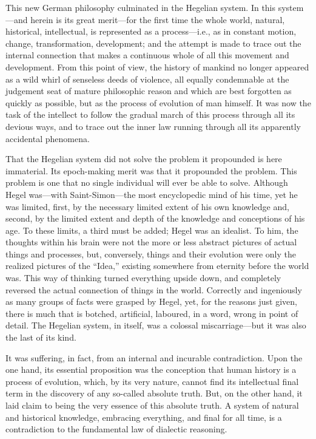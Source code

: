 This new German philosophy culminated in the Hegelian system. In this
system---and herein is its great merit---for the first time the whole world,
natural, historical, intellectual, is represented as a process---i.e., as in
constant motion, change, transformation, development; and the attempt is made to
trace out the internal connection that makes a continuous whole of all this
movement and development. From this point of view, the history of mankind no
longer appeared as a wild whirl of senseless deeds of violence, all equally
condemnable at the judgement seat of mature philosophic reason and which are best
forgotten as quickly as possible, but as the process of evolution of man
himself. It was now the task of the intellect to follow the gradual march of
this process through all its devious ways, and to trace out the inner law running
through all its apparently accidental phenomena.

That the Hegelian system did not solve the problem it propounded is here
immaterial. Its epoch-making merit was that it propounded the problem. This
problem is one that no single individual will ever be able to solve. Although
Hegel was---with Saint-Simon---the most encyclopedic mind of his time, yet he
was limited, first, by the necessary limited extent of his own knowledge and,
second, by the limited extent and depth of the knowledge and conceptions of his
age. To these limits, a third must be added; Hegel was an idealist. To him, the
thoughts within his brain were not the more or less abstract pictures of actual
things and processes, but, conversely, things and their evolution were only the
realized pictures of the ``Idea,'' existing somewhere from eternity before the
world was. This way of thinking turned everything upside down, and completely
reversed the actual connection of things in the world. Correctly and ingeniously
as many groups of facts were grasped by Hegel, yet, for the reasons just given,
there is much that is botched, artificial, laboured, in a word, wrong in point
of detail. The Hegelian system, in itself, was a colossal miscarriage---but it
was also the last of its kind.

It was suffering, in fact, from an internal and incurable contradiction. Upon
the one hand, its essential proposition was the conception that human history is
a process of evolution, which, by its very nature, cannot find its intellectual
final term in the discovery of any so-called absolute truth. But, on the other
hand, it laid claim to being the very essence of this absolute truth. A system
of natural and historical knowledge, embracing everything, and final for all
time, is a contradiction to the fundamental law of dialectic reasoning.


